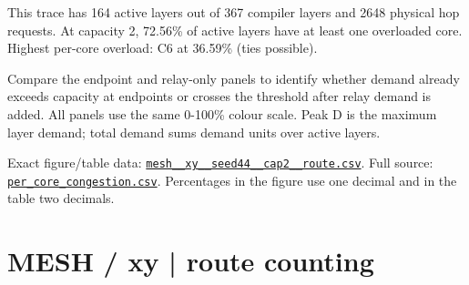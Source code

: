 \documentclass[10pt,a4paper]{article}
\begin{document}
This trace has 164 active layers out of 367 compiler layers and 2648 physical hop requests. At capacity 2, 72.56\% of active layers have at least one overloaded core. Highest per-core overload: C6 at 36.59\% (ties possible).\par
Compare the endpoint and relay-only panels to identify whether demand already exceeds capacity at endpoints or crosses the threshold after relay demand is added. All panels use the same 0-100\% colour scale. Peak D is the maximum layer demand; total demand sums demand units over active layers.\par
Exact figure/table data: \href{\detokenize{file:///home/dhruv-pansuriya/Documents/BTP/Compiler-Driven-ACE/output/pdf/qaoa_methods_congestion/tables/mesh__xy__seed44__cap2__route.csv}}{\nolinkurl{mesh__xy__seed44__cap2__route.csv}}. Full source: \href{\detokenize{file:///home/dhruv-pansuriya/Documents/BTP/Compiler-Driven-ACE/results/qaoa_2seed_2026-10-26/congestion/per_core_congestion.csv}}{\nolinkurl{per_core_congestion.csv}}. Percentages in the figure use one decimal and in the table two decimals.\par
\clearpage
\section*{MESH / xy | route counting}
\end{document}
